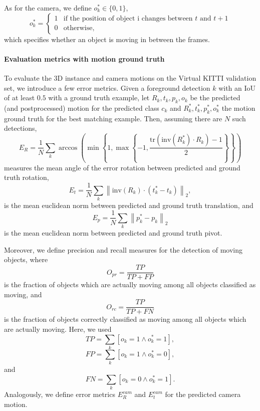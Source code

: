 As for the camera, we define $o_k^* \in \{ 0, 1 \}$,
\begin{equation}
o_k^* =
\begin{cases}
1 &\text{if the position of object i changes between $t$ and $t+1$} \\
0 &\text{otherwise,}
\end{cases}
\end{equation}
which specifies whether an object is moving in between the frames.

\paragraph{Evaluation metrics with motion ground truth}
To evaluate the 3D instance and camera motions on the Virtual KITTI validation
set, we introduce a few error metrics.
Given a foreground detection $k$ with an IoU of at least $0.5$ with a ground truth example,
let $R_k, t_k, p_k, o_k$ be the predicted (and postprocessed) motion for the predicted class $c_k$
and $R_k^*, t_k^*, p_k^*, o_k^*$ the motion ground truth for the best matching example.
Then, assuming there are $N$ such detections,
\begin{equation}
E_{R} = \frac{1}{N}\sum_k \arccos\left( \min\left\{1, \max\left\{-1, \frac{\mathrm{tr}(\mathrm{inv}(R_k^*) \cdot R_k) - 1}{2} \right\}\right\} \right)
\end{equation}
measures the mean angle of the error rotation between predicted and ground truth rotation,
\begin{equation}
E_{t} = \frac{1}{N}\sum_k  \left\lVert \mathrm{inv}(R_k) \cdot (t_k^* - t_k) \right\rVert_2,
\end{equation}
is the mean euclidean norm between predicted and ground truth translation, and
\begin{equation}
E_{p} = \frac{1}{N}\sum_k \left\lVert p_k^* - p_k \right\rVert_2
\end{equation}
is the mean euclidean norm between predicted and ground truth pivot.

Moreover, we define precision and recall measures for the detection of moving objects,
where
\begin{equation}
O_{pr} = \frac{\mathit{TP}}{\mathit{TP} + \mathit{FP}}
\end{equation}
is the fraction of objects which are actually moving among all objects classified as moving,
and
\begin{equation}
O_{rc} = \frac{\mathit{TP}}{\mathit{TP} + \mathit{FN}}
\end{equation}
is the fraction of objects correctly classified as moving among all objects which are actually moving.
Here, we used
\begin{equation}
\mathit{TP} = \sum_k [o_k = 1 \land o_k^* = 1],
\end{equation}
\begin{equation}
\mathit{FP} = \sum_k [o_k = 1 \land o_k^* = 0],
\end{equation}
and
\begin{equation}
\mathit{FN} = \sum_k [o_k = 0 \land o_k^* = 1].
\end{equation}
Analogously, we define error metrics $E_{R}^{cam}$ and $E_{t}^{cam}$ for
the predicted camera motion.

